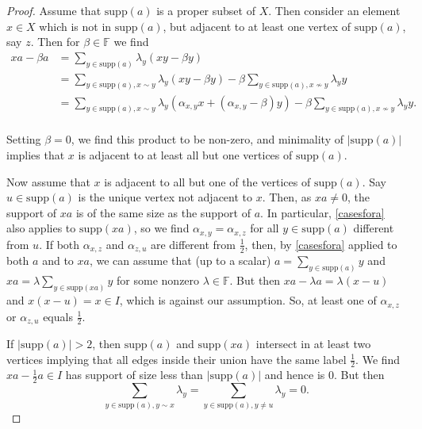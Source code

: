 \documentclass[10pt,a4paper]{amsart}
\begin{document}
\begin{proof}
Assume that $\mathrm{supp}(a)$ is a proper subset of $X$.
Then consider an element $x\in X$ which is not in $\mathrm{supp}(a)$, but adjacent to at least one vertex of $\mathrm{supp}(a)$, say $z$.
Then for $\beta\in \mathbb{F}$ we find
$$\begin{array}{ll}
xa-\beta a
&=\displaystyle\sum_{y\in \mathrm{supp}(a)} \lambda_y (xy-\beta y)\\
&=\displaystyle\sum_{y\in \mathrm{supp}(a),x\sim y}  \lambda_y(xy-\beta y)-\beta \sum_{y\in \mathrm{supp}(a),x\not\sim y} \lambda_y y\\
&=\displaystyle\sum_{y\in \mathrm{supp}(a),x\sim y} \lambda_y(\alpha_{x,y} x +(\alpha_{x,y}-\beta) y)-\beta \sum_{y\in \mathrm{supp}(a),x\not\sim y} \lambda_y y.\\

\end{array}$$

Setting  $\beta=0$, we find this product to be non-zero, and 
minimality of $|\mathrm{supp}(a)|$ implies that $x$ is adjacent to at least all but one vertices of $\mathrm{supp}(a)$.



Now assume that  $x$ is adjacent to all but one of the vertices of $\mathrm{supp}(a)$. Say $u\in \mathrm{supp}(a)$ is the unique vertex not adjacent to $x$.
Then, as $xa\neq 0$,  the support of $xa$ is of the same size  as the support of $a$.
In particular,  \cref{casesfora} also applies to $\mathrm{supp}(xa)$, so we find $\alpha_{x,y}=\alpha_{x,z}$ for all $y\in \mathrm{supp}(a)$ different from $u$. 
If both $\alpha_{x,z}$ and $\alpha_{z,u}$ are different from $\frac{1}{2}$, then, by \cref{casesfora} applied to both  $a$ and to $xa$, we can assume
that (up to a scalar) $a= \displaystyle\sum_{y\in \mathrm{supp}(a)} y$ and $xa=\lambda\displaystyle\sum_{y\in \mathrm{supp}(xa)} y$ for some nonzero $\lambda\in\mathbb{F}$.
But then $xa-\lambda a=\lambda (x-u)$ and $x(x-u)=x\in I$, which is against our assumption.
So, at least one of $\alpha_{x,z}$ or $\alpha_{z,u}$ equals $\frac{1}{2}$.

 
If $|\mathrm{supp}(a)|>2$, then  $\mathrm{supp}(a)$ and $\mathrm{supp}(xa)$ intersect in at least two vertices implying that all
edges inside their union have the same label $\frac{1}{2}$.
We find  $xa-\frac{1}{2} a\in I$ has support of size less than $|\mathrm{supp}(a)|$ and hence  is $0$.
But then   
$$\displaystyle\sum_{y\in \mathrm{supp}(a),y\sim x} \lambda_y =\displaystyle\sum_{y\in \mathrm{supp}(a),y\neq u} \lambda_y=0.$$


\end{proof}
\end{document}
